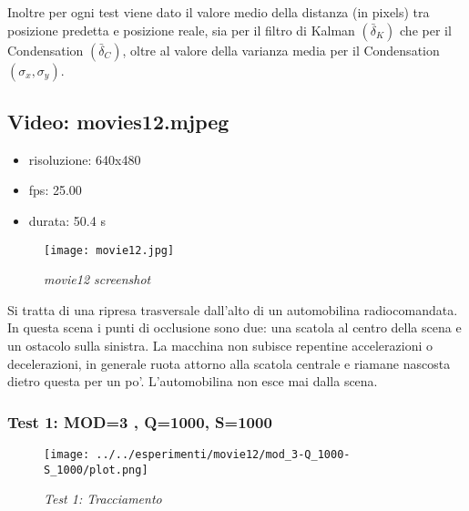 Inoltre per ogni test viene dato il valore medio della distanza (in pixels) tra posizione predetta e posizione reale, sia per il filtro di Kalman \begin{math}(\bar \delta_K)\end{math} che per il Condensation \begin{math}(\bar \delta_C)\end{math}, oltre al valore della varianza media per il Condensation \begin{math}(\sigma_x,\sigma_y)\end{math}.


\newpage

\subsection{Video: movies12.mjpeg}\label{sec:video-occ}
\begin{itemize}
\item risoluzione: 640x480
\item fps: 25.00
\item durata: 50.4 s
\end{itemize}

\begin{figure}[hb]
\centering
	\texttt{[image: movie12.jpg]}
\caption{\textit{movie12 screenshot}}
\end{figure}

Si tratta di una ripresa trasversale dall'alto di un automobilina radiocomandata. In questa scena i punti di occlusione sono due: una scatola al centro della scena e un ostacolo sulla sinistra. La macchina non subisce repentine accelerazioni o decelerazioni, in generale ruota attorno alla scatola centrale e riamane nascosta dietro questa per un po'. L'automobilina non esce mai dalla scena.

 
\newpage
\subsubsection{Test 1: MOD=3 , Q=1000, S=1000}

\begin{figure}[hb]
\centering
	\texttt{[image: ../../esperimenti/movie12/mod\_3-Q\_1000-S\_1000/plot.png]}
\caption{\textit{Test 1: Tracciamento}}
\end{figure}

